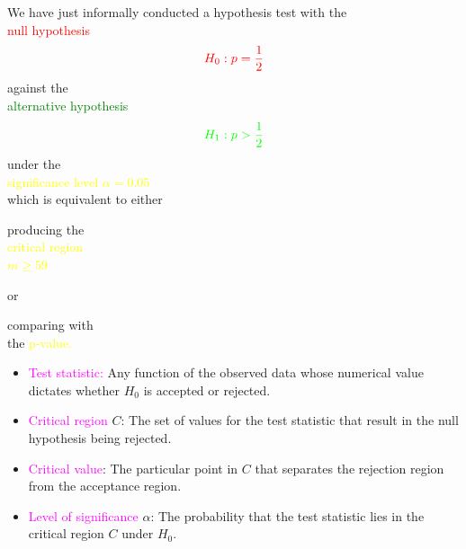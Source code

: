 \begin{frame}[fragile]
 \begin{center}
 \begin{minipage}{0.6\textwidth}
 \begin{center}
 We have just informally conducted a hypothesis test with the\\
 \textcolor{red}{null hypothesis}
 \begin{align*}
   \textcolor{red}{H_0: p=\frac{1}{2}}
 \end{align*}
 against the \\
 \textcolor{green}{alternative hypothesis}
 \begin{align*}
   \textcolor{green}{H_1: p>\frac{1}{2}}
 \end{align*}
 under the\\
 \textcolor{yellow}{significance level $\alpha=0.05$}\\[0.5em]
 which is equivalent to either \\[1em]
 \begin{minipage}{0.45\textwidth}
 \begin{center}
 producing the \\
 \textcolor{yellow}{critical region\\
 $m\ge 59$}
 \end{center}
 \end{minipage}
 \hfill or \hfill
 \begin{minipage}{0.45\textwidth}
 \begin{center}
 comparing with \\
 the \textcolor{yellow}{p-value.}
 \end{center}
 \end{minipage}
 \end{center}
 \end{minipage}
\end{center}
\end{frame}
\begin{frame}
\begin{itemize}
  \item  \textcolor{magenta}{Test statistic:}
		Any function of the observed data whose numerical value
		dictates whether $H_0$ is accepted or rejected.
	\vfill
  \item  \textcolor{magenta}{Critical region} $C$:
		The set of values for the test statistic that result in
		the null hypothesis being rejected.\\[1em]
  \item[] \textcolor{magenta}{Critical value}:
		The particular point in $C$ that separates the rejection region from the acceptance region.
	\vfill
   \item \textcolor{magenta}{Level of significance} $\alpha$:
		The probability that the test statistic lies in the critical region $C$ under $H_0$.
\end{itemize}
\end{frame}
